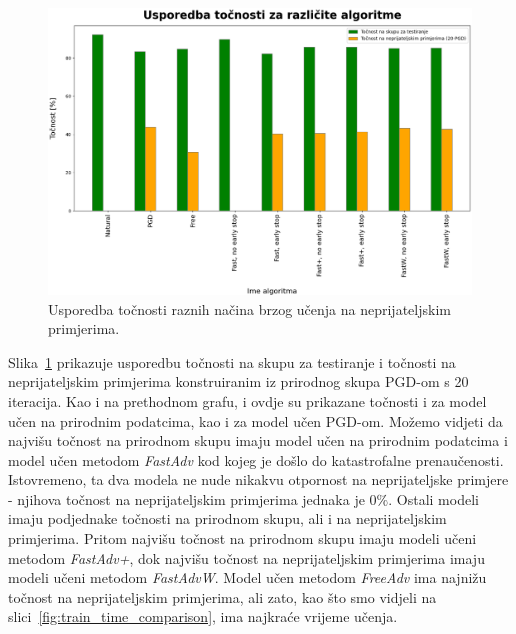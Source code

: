 \documentclass[times, utf8, zavrsni, numeric]{fer}
\begin{document}
\pagebreak
\begin{figure}[htb]
    \centering
    \includegraphics[scale=0.42]{../stats/stats_comparison.png}
    \caption{Usporedba točnosti raznih načina brzog učenja na neprijateljskim primjerima.}
    \label{fig:acc_comparison}
\end{figure}

Slika~\ref{fig:acc_comparison} prikazuje usporedbu točnosti na skupu za testiranje i točnosti na neprijateljskim primjerima konstruiranim iz prirodnog skupa PGD-om s 20 iteracija.
Kao i na prethodnom grafu, i ovdje su prikazane točnosti i za model učen na prirodnim podatcima, kao i za model učen PGD-om.
Možemo vidjeti da najvišu točnost na prirodnom skupu imaju model učen na prirodnim podatcima i model učen metodom \textit{FastAdv} kod kojeg je došlo do katastrofalne prenaučenosti.
Istovremeno, ta dva modela ne nude nikakvu otpornost na neprijateljske primjere - njihova točnost na neprijateljskim primjerima jednaka je $0\%$.
Ostali modeli imaju podjednake točnosti na prirodnom skupu, ali i na neprijateljskim primjerima.
Pritom najvišu točnost na prirodnom skupu imaju modeli učeni metodom \textit{FastAdv+}, dok najvišu točnost na neprijateljskim primjerima imaju modeli učeni metodom \textit{FastAdvW}.
Model učen metodom \textit{FreeAdv} ima najnižu točnost na neprijateljskim primjerima, ali zato, kao što smo vidjeli na slici~\ref{fig:train_time_comparison}, ima najkraće vrijeme učenja.
\end{document}
